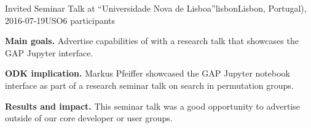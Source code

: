 \begin{event}{Invited Seminar Talk at ``Universidade Nova de
    Lisboa''}{lisbon}{Lisbon, Portugal), 2016-07-19}{USO}{6 participants}{}

\textbf{Main goals.} Advertise capabilities of \ODK with a research talk
that showcases the GAP Jupyter interface.

\textbf{ODK implication.} Markus Pfeiffer showcased the GAP Jupyter notebook
interface as part of a research seminar talk on search in permutation groups.

\textbf{Results and impact.} 
This seminar talk was a good opportunity to advertise \ODK outside of
our core developer or user groups.

\end{event}
